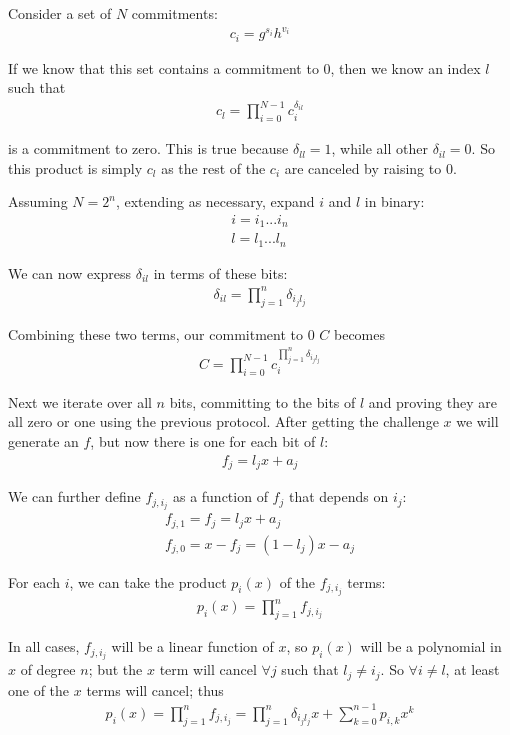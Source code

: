 \documentclass{article}
\begin{document}
Consider a set of $N$ commitments:
\begin{align}
  c_i = g^{s_i} h^{v_i}
\end{align}

If we know that this set contains a commitment to $0$, then we know an index $l$ such that
\begin{align}
  c_l = \prod_{i=0}^{N-1} c_i^{\delta_{il}}
\end{align}

is a commitment to zero.  This is true because $\delta_{ll} = 1$, while all other $\delta_{il} = 0$. So this product is simply $c_l$ as the rest of the $c_i$ are canceled by raising to $0$.

Assuming $N = 2^n$, extending as necessary, expand $i$ and $l$ in binary:
\begin{align}
  i = i_1...i_n\\
  l = l_1...l_n
\end{align}

We can now express $\delta_{il}$ in terms of these bits:
\begin{align}
  \delta_{il} = \prod_{j=1}^{n} \delta_{i_jl_j}
\end{align}
  
Combining these two terms, our commitment to $0$ $C$ becomes
\begin{align}
  C = \prod_{i=0}^{N-1}c_i^{\prod_{j=1}^{n} \delta_{i_jl_j}}
\end{align}

Next we iterate over all $n$ bits, committing to the bits of $l$ and proving they are all zero or one using the previous protocol.  After getting the challenge $x$ we will generate an $f$, but now there is one for each bit of $l$:
\begin{align}
  f_j = l_j x + a_j
\end{align}

We can further define $f_{j, i_j}$ as a function of $f_j$ that depends on $i_j$:
\begin{align}
  f_{j,1} = f_j = l_j x + a_j\\
  f_{j,0} = x - f_j = (1 - l_j) x - a_j
\end{align}

For each $i$, we can take the product $p_i(x)$ of the $f_{j, i_j}$ terms:
\begin{align}
  p_i(x) = \prod_{j=1}^{n} f_{j, i_j}
\end{align}

In all cases, $f_{j, i_j}$ will be a linear function of $x$, so $p_i(x)$ will be a polynomial in $x$ of degree $n$; but the $x$ term will cancel $\forall j$ such that $l_j \ne i_j$.  So $\forall i \ne l$, at least one of the $x$ terms will cancel; thus
\begin{align}
  p_i(x) = \prod_{j=1}^n f_{j,i_j} = {\prod_{j=1}^{n}\delta_{i_jl_j} x} + \sum_{k=0}^{n-1}{p_{i,k} x^k}
\end{align}
\end{document}
